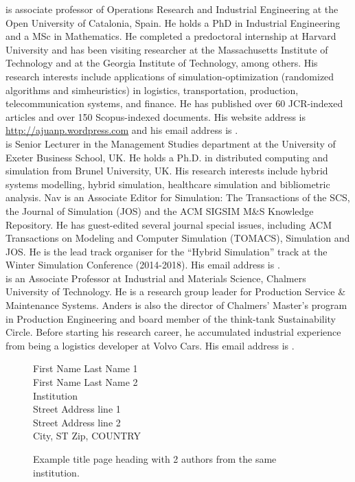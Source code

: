 \documentclass{wscpaperproc}
\theoremstyle{wsc}
\begin{document}
 is associate professor of Operations Research and Industrial Engineering at the Open University of Catalonia, Spain. He holds a PhD in Industrial Engineering and a MSc in Mathematics. He completed a predoctoral internship at Harvard University and has been visiting researcher at the Massachusetts Institute of Technology and at the Georgia Institute of Technology, among others. His research interests include applications of simulation-optimization (randomized algorithms and simheuristics) in logistics, transportation, production, telecommunication systems, and finance. He has published over 60 JCR-indexed articles and over 150 Scopus-indexed documents. His website address is \href{http://ajuanp.wordpress.com}{http://ajuanp.wordpress.com} and his email address is . \\

 is Senior Lecturer in the Management Studies department at the University of Exeter Business School, UK. He holds a Ph.D. in distributed computing and simulation from Brunel University, UK. His research interests include hybrid systems modelling, hybrid simulation, healthcare simulation and bibliometric analysis. Nav is an Associate Editor for Simulation: The Transactions of the SCS, the Journal of Simulation (JOS) and the ACM SIGSIM M\&S Knowledge Repository. He has guest-edited several journal special issues, including ACM Transactions on Modeling and Computer Simulation (TOMACS), Simulation and JOS. He is the lead track organiser for the ``Hybrid Simulation'' track at the Winter Simulation Conference (2014-2018). His email address is .\\

 is an Associate Professor at Industrial and Materials Science, Chalmers University of Technology. He is a research group leader for Production Service \& Maintenance Systems. Anders is also the director of Chalmers' Master's program in Production Engineering and board member of the think-tank Sustainability Circle. Before starting his research career, he accumulated industrial experience from being a logistics developer at Volvo Cars. His email address is .\\


\newpage

\begin{figure}[htb]
{
\centering
First Name Last Name 1 \\
First Name Last Name 2 \\
\vspace{12pt}
Institution \\
Street Address line 1 \\
Street Address line 2 \\
City, ST Zip, COUNTRY
\caption{Example title page heading with 2 authors from the same institution.\label{fig: 2 same}}
}
\end{figure}
\end{document}

